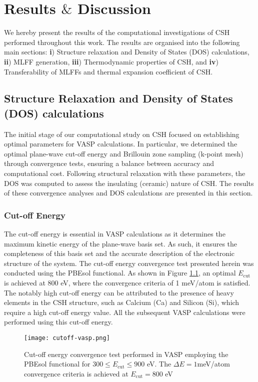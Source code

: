 \chapter{\texorpdfstring{Results $\&$ Discussion}{Results \& Discussion}}
\label{Chapter4}
We hereby present the results of the computational investigations of CSH performed throughout this work. The results are organised into the following main sections: \textbf{i}) Structure relaxation and Density of States (DOS) calculations, \textbf{ii}) MLFF generation, \textbf{iii}) Thermodynamic properties of CSH, and \textbf{iv}) Transferability of MLFFs and thermal expansion coefficient of CSH. 
 
\section{Structure Relaxation and Density of States (DOS) calculations}
\label{sec:bulk-params-dos}
The initial stage of our computational study on CSH focused on establishing optimal parameters for VASP calculations. In particular, we determined the optimal plane-wave cut-off energy and Brillouin zone sampling (k-point mesh) through convergence tests, ensuring a balance between accuracy and computational cost. Following structural relaxation with these parameters, the DOS was computed to assess the insulating (ceramic) nature of CSH. The results of these convergence analyses and DOS calculations are presented in this section.
\subsection{Cut-off Energy}
The cut-off energy is essential in VASP calculations as it determines the maximum kinetic energy of the plane-wave basis set. As such, it ensures the completeness of this basis set and the accurate description of the electronic structure of the system.  The cut-off energy convergence test presented herein was conducted using the PBEsol functional. As shown in Figure \ref{cutoff-energy}, an optimal $E_{\text{cut}}$ is achieved at 800 eV, where the convergence criteria of 1 meV/atom is satisfied. The notably high cut-off energy can be attributed to the presence of heavy elements in the CSH structure, such as Calcium (Ca) and Silicon (Si), which require a high cut-off energy value\supercite{zotero-item-698}. All the subsequent VASP calculations were performed using this cut-off energy.
\begin{figure}[H]
    \centering
    \texttt{[image: cutoff-vasp.png]}
    \caption{
    Cut-off energy convergence test performed in VASP employing the PBEsol functional for $300 \leq E_{\text{cut}} \leq 900$ eV. The $\Delta E = 1$meV/atom convergence criteria is achieved at $E_{\text {cut}} = 800$ eV}
    \label{cutoff-energy}
\end{figure}

